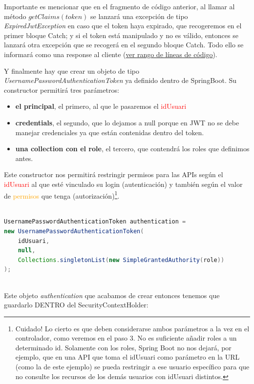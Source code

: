 \documentclass[a4paper,12pt]{report}
\begin{document}
		  Importante es mencionar que en el fragmento de código anterior, al llamar al método $getClaims(token)$  se lanzará una excepción de tipo \textit{ExpiredJwtException} en caso que el token haya expirado, que recogeremos en el primer bloque Catch; y si el token está manipulado y no es válido, entonces se lanzará otra excepción que se recogerá en el segundo bloque Catch. Todo ello se informará como una response al cliente (\href{https://github.com/blackcub3s/mercApp/blob/89efcf854d8bbab2addde3f7e817eb97f7737b95/APP%20WEB/__springboot__produccio__/app/src/main/java/miApp/app/seguretat/FiltreAutenticacioJwt.java#L96-L115}{ver rango de líneas de código}).
		  
		  
		  Y finalmente hay que crear un objeto de tipo \textit{UsernamePasswordAuthenticationToken} ya definido dentro de SpringBoot. Su constructor permitirá tres parámetros: 
		 
		 	\begin{itemize}
		 	\setlength{\itemsep}{-.5em}

			  \item \textbf{el principal}, el primero, al que le pasaremos el \textcolor{red}{idUsuari}
			 \item  \textbf{credentials}, el segundo, que lo dejamos a null porque en JWT no se debe manejar credenciales ya que están contenidas dentro del token. 
			  \item \textbf{una collection con el role}, el tercero, que contendrá los roles que definimos antes. 
		  \end{itemize}
		  Este constructor nos permitirá restringir permisos para las APIs según el \textcolor{red}{idUsuari} al que esté vinculado su login (autenticación) y también según el valor de \textcolor{orange}{permisos} que tenga (autorización)\footnote{Cuidado! Lo cierto es que deben considerarse ambos parámetros a la vez en el controlador, como veremos en el paso 3. No es suficiente añadir roles a un determinado id. Solamente con los roles, Spring Boot no nos dejará, por ejemplo, que en una API que toma el idUsuari como parámetro en la URL (como la de este ejemplo) se pueda restringir a ese usuario específico para que no consulte los recursos de los demás usuarios con idUsuari distintos.}.
		  

		  
		  
 \begin{lstlisting}[language=Java, basicstyle=\ttfamily\footnotesize, keywordstyle=\color{magenta}]
	  	
UsernamePasswordAuthenticationToken authentication = 
new UsernamePasswordAuthenticationToken(
	idUsuari,
	null,
	Collections.singletonList(new SimpleGrantedAuthority(role))
);



 \end{lstlisting}
Este objeto \textit{authentication} que acabamos de crear entonces tenemos que guardarlo DENTRO del SecurityContextHolder:
\end{document}
